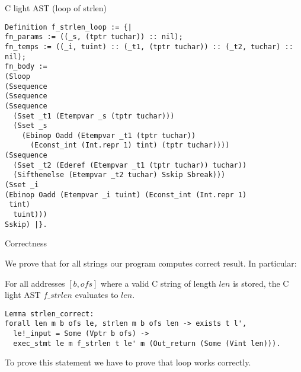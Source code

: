 \documentclass{beamer}
\begin{document}
\begin{frame}[fragile]{C light AST (loop of strlen)}

\begin{lstlisting}[language=Coq]
Definition f_strlen_loop := {|
fn_params := ((_s, (tptr tuchar)) :: nil);
fn_temps := ((_i, tuint) :: (_t1, (tptr tuchar)) :: (_t2, tuchar) :: nil);
fn_body := 
(Sloop
(Ssequence
(Ssequence
(Ssequence
  (Sset _t1 (Etempvar _s (tptr tuchar)))
  (Sset _s
    (Ebinop Oadd (Etempvar _t1 (tptr tuchar))
      (Econst_int (Int.repr 1) tint) (tptr tuchar))))
(Ssequence
  (Sset _t2 (Ederef (Etempvar _t1 (tptr tuchar)) tuchar))
  (Sifthenelse (Etempvar _t2 tuchar) Sskip Sbreak)))
(Sset _i
(Ebinop Oadd (Etempvar _i tuint) (Econst_int (Int.repr 1)
 tint)
  tuint)))
Sskip) |}.

\end{lstlisting}

\end{frame}

\begin{frame}[fragile]{Correctness}

  We prove that for all strings our program computes correct result. In particular:
  
  \begin{theorem}
    For all addresses $[b, ofs]$ where a valid C string of length $len$ is stored, the C light AST $f\_strlen$ evaluates to $len$.
  \end{theorem}
  
  
  \begin{lstlisting}[language=Coq]
Lemma strlen_correct:
forall len m b ofs le, strlen m b ofs len -> exists t l',
  le!_input = Some (Vptr b ofs) ->
  exec_stmt le m f_strlen t le' m (Out_return (Some (Vint len))).

\end{lstlisting}

To prove this statement we have to prove that loop works correctly.

 



\end{frame}
\end{document}
